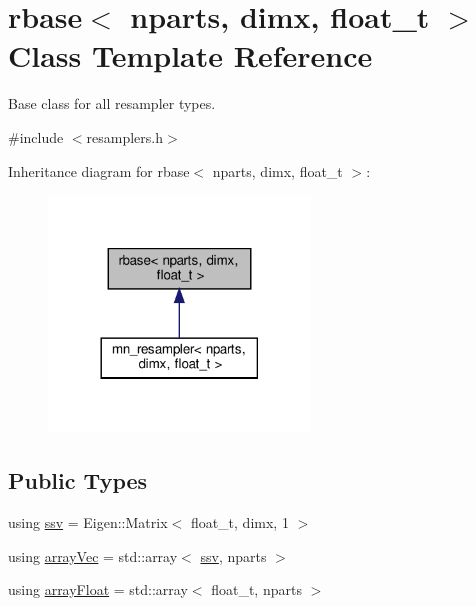 \hypertarget{classrbase}{}\section{rbase$<$ nparts, dimx, float\+\_\+t $>$ Class Template Reference}
\label{classrbase}


Base class for all resampler types.  




{\ttfamily \#include $<$resamplers.\+h$>$}



Inheritance diagram for rbase$<$ nparts, dimx, float\+\_\+t $>$\+:
\nopagebreak
\begin{figure}[H]
\begin{center}
\leavevmode
\includegraphics[width=197pt]{classrbase__inherit__graph}
\end{center}
\end{figure}
\subsection*{Public Types}
\begin{DoxyCompactItemize}
\item 
using \hyperlink{classrbase_ae20e0b8df15aa109252f57ecbf1f20f8}{ssv} = Eigen\+::\+Matrix$<$ float\+\_\+t, dimx, 1 $>$
\item 
using \hyperlink{classrbase_aa12fc826befa6ba0647b5f59ebc396ee}{array\+Vec} = std\+::array$<$ \hyperlink{classrbase_ae20e0b8df15aa109252f57ecbf1f20f8}{ssv}, nparts $>$
\item 
using \hyperlink{classrbase_a6f76bef853e508cb5b6f546d231b06f5}{array\+Float} = std\+::array$<$ float\+\_\+t, nparts $>$
\end{DoxyCompactItemize}
